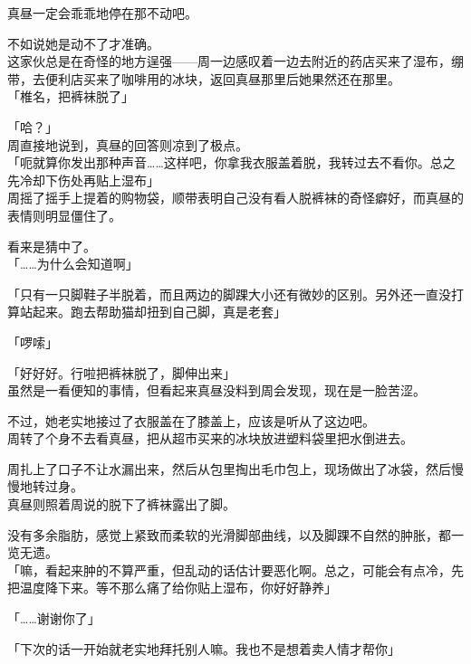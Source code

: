 真昼一定会乖乖地停在那不动吧。

不如说她是动不了才准确。\\

这家伙总是在奇怪的地方逞强——周一边感叹着一边去附近的药店买来了湿布，绷带，去便利店买来了咖啡用的冰块，返回真昼那里后她果然还在那里。\\

「椎名，把裤袜脱了」

「哈？」\\

周直接地说到，真昼的回答则凉到了极点。\\

「呃就算你发出那种声音……这样吧，你拿我衣服盖着脱，我转过去不看你。总之先冷却下伤处再贴上湿布」\\

周摇了摇手上提着的购物袋，顺带表明自己没有看人脱裤袜的奇怪癖好，而真昼的表情则明显僵住了。

看来是猜中了。\\

「……为什么会知道啊」

「只有一只脚鞋子半脱着，而且两边的脚踝大小还有微妙的区别。另外还一直没打算站起来。跑去帮助猫却扭到自己脚，真是老套」

「啰嗦」

「好好好。行啦把裤袜脱了，脚伸出来」\\

虽然是一看便知的事情，但看起来真昼没料到周会发现，现在是一脸苦涩。

不过，她老实地接过了衣服盖在了膝盖上，应该是听从了这边吧。\\

周转了个身不去看真昼，把从超市买来的冰块放进塑料袋里把水倒进去。

周扎上了口子不让水漏出来，然后从包里掏出毛巾包上，现场做出了冰袋，然后慢慢地转过身。\\

真昼则照着周说的脱下了裤袜露出了脚。

没有多余脂肪，感觉上紧致而柔软的光滑脚部曲线，以及脚踝不自然的肿胀，都一览无遗。\\

「嘛，看起来肿的不算严重，但乱动的话估计要恶化啊。总之，可能会有点冷，先把温度降下来。等不那么痛了给你贴上湿布，你好好静养」

「……谢谢你了」

「下次的话一开始就老实地拜托别人嘛。我也不是想着卖人情才帮你」\\

